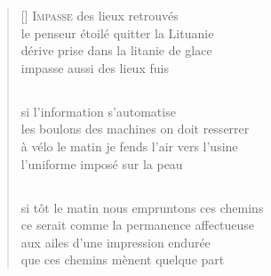 \documentclass[a4paper, titlepage, twoside, 12pt]{book}
\begin{document}
\newpage


\vspace*{2cm}
\settowidth{\versewidth}{que ces chemins menent quelque part}
\begin{verse}[\versewidth]
{\lettrine[lines=1]{\textcolor[gray]{0.6}{I}}{\space mpasse}} des lieux retrouvés\\
le penseur étoilé quitter la Lituanie\\
dérive prise dans la litanie de glace\\
impasse aussi des lieux fuis
\subsection*{}
si l'information s'automatise\\
les boulons des machines on doit resserrer\\
à vélo le matin je fends l'air vers l'usine\\
l'uniforme imposé sur la peau\\
\subsection*{}
si tôt le matin nous empruntons ces chemins\\
ce serait comme la permanence affectueuse\\
aux ailes d'une impression endurée\\
que ces chemins mènent quelque part
\end{verse}
\end{document}
